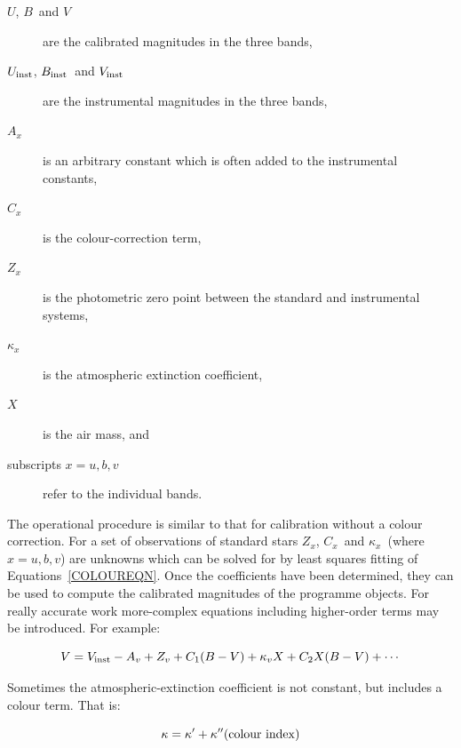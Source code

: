 \documentclass[twoside,11pt]{article}
\begin{document}
\begin{description}

  \item[{\rm $U$, $B$\, and $V$}] are the calibrated magnitudes in the
   three bands,

  \item[{\rm $U_{\rm inst}$, $B_{\rm inst}$\, and $V_{\rm inst}$}] are
   the instrumental magnitudes in the three bands,

  \item[$A_{x}$] is an arbitrary constant which is often added to the
   instrumental constants,

  \item[$C_{x}$] is the colour-correction term,

  \item[$Z_{x}$] is the photometric zero point between the standard and
   instrumental systems,

  \item[$\kappa_{x}$] is the atmospheric extinction coefficient,

  \item[$X$] is the air mass, and

  \item[{\rm subscripts $x = u, b, v$}] refer to the individual bands.

\end{description}

The operational procedure is similar to that for calibration without a
colour correction.  For a set of observations of standard stars $Z_{x}$,
$C_{x}$\, and $\kappa_{x}$\, (where $x = u, b, v$) are unknowns which
can be solved for by least squares fitting of Equations~\ref{COLOUREQN}.
Once the coefficients have been determined, they can be used to compute
the calibrated magnitudes of the programme objects.  For really accurate
work more-complex equations including higher-order terms may be
introduced.  For example:

\begin{equation}
V = V_{\rm inst} - A_{v} + Z_{v} + C_{1}(B-V) + \kappa_vX +
  C_{2}X(B-V) + \cdots
\end{equation}

Sometimes the atmospheric-extinction coefficient is not constant, but
includes a colour term.  That is:

\begin{equation}
\kappa = \kappa ' + \kappa '' ({\rm colour~index})
\end{equation}
\end{document}
